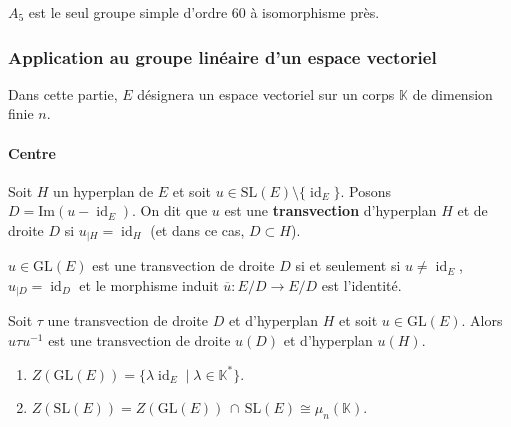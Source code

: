
  \begin{application}
    $A_5$ est le seul groupe simple d'ordre $60$ à isomorphisme près.
  \end{application}

  \subsubsection{Application au groupe linéaire d'un espace vectoriel}

  Dans cette partie, $E$ désignera un espace vectoriel sur un corps $\mathbb{K}$ de dimension finie $n$.

  \paragraph{Centre}


  \begin{definition}
    Soit $H$ un hyperplan de $E$ et soit $u \in \mathrm{SL}(E) \setminus \{ \operatorname{id}_E \}$. Posons $D = \mathrm{Im}(u - \operatorname{id}_E)$. On dit que $u$ est une \textbf{transvection} d'hyperplan $H$ et de droite $D$ si $u_{|H} = \operatorname{id}_H$ (et dans ce cas, $D \subset H$).
  \end{definition}

  \begin{proposition}
    $u \in \mathrm{GL}(E)$ est une transvection de droite $D$ si et seulement si $u \neq \operatorname{id}_E$, $u_{|D} = \operatorname{id}_D$ et le morphisme induit $\overline{u} : E/D \rightarrow E/D$ est l'identité.
  \end{proposition}

  \begin{proposition}
    Soit $\tau$ une transvection de droite $D$ et d'hyperplan $H$ et soit $u \in \mathrm{GL}(E)$. Alors $u \tau u^{-1}$ est une transvection de droite $u(D)$ et d'hyperplan $u(H)$.
  \end{proposition}

  \begin{corollary}
    \begin{enumerate}[label={\bfseries(\roman*)}]
      \item $Z(\mathrm{GL}(E)) = \{ \lambda \operatorname{id}_E \mid \lambda \in \mathbb{K}^* \}$.
      \item $Z(\mathrm{SL}(E)) = Z(\mathrm{GL}(E)) \, \cap \, \mathrm{SL}(E) \cong \mu_n(\mathbb{K})$.
    \end{enumerate}
  \end{corollary}


